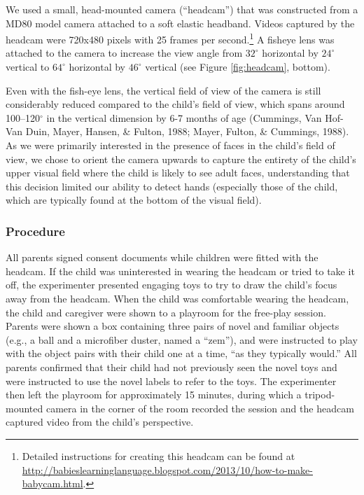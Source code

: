 \documentclass[10pt, letterpaper]{article}
\begin{document}
We used a small, head-mounted camera (``headcam'') that was constructed
from a MD80 model camera attached to a soft elastic headband. Videos
captured by the headcam were 720x480 pixels with 25 frames per
second.\footnote{Detailed instructions for creating this headcam can be
  found at
  \url{http://babieslearninglanguage.blogspot.com/2013/10/how-to-make-babycam.html}.}
A fisheye lens was attached to the camera to increase the view angle
from \(32^{\circ}\) horizontal by \(24^{\circ}\) vertical to
\(64^{\circ}\) horizontal by \(46^{\circ}\) vertical (see Figure
\ref{fig:headcam}, bottom).

Even with the fish-eye lens, the vertical field of view of the camera is
still considerably reduced compared to the child's field of view, which
spans around 100--120\(^{\circ}\) in the vertical dimension by 6-7
months of age (Cummings, Van Hof-Van Duin, Mayer, Hansen, \& Fulton,
1988; Mayer, Fulton, \& Cummings, 1988). As we were primarily interested
in the presence of faces in the child's field of view, we chose to
orient the camera upwards to capture the entirety of the child's upper
visual field where the child is likely to see adult faces, understanding
that this decision limited our ability to detect hands (especially those
of the child, which are typically found at the bottom of the visual
field).

\subsubsection{Procedure}\label{procedure}

All parents signed consent documents while children were fitted with the
headcam. If the child was uninterested in wearing the headcam or tried
to take it off, the experimenter presented engaging toys to try to draw
the child's focus away from the headcam. When the child was comfortable
wearing the headcam, the child and caregiver were shown to a playroom
for the free-play session. Parents were shown a box containing three
pairs of novel and familiar objects (e.g., a ball and a microfiber
duster, named a ``zem''), and were instructed to play with the object
pairs with their child one at a time, ``as they typically would.'' All
parents confirmed that their child had not previously seen the novel
toys and were instructed to use the novel labels to refer to the toys.
The experimenter then left the playroom for approximately 15 minutes,
during which a tripod-mounted camera in the corner of the room recorded
the session and the headcam captured video from the child's perspective.
\end{document}
